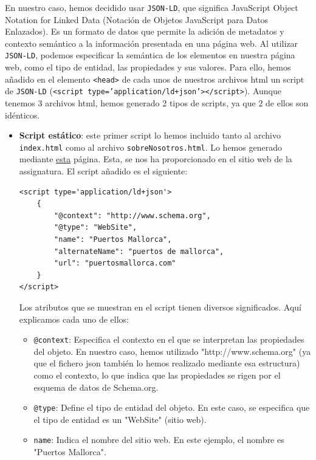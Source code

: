 \documentclass{article}
\begin{document}
\noindent En nuestro caso, hemos decidido usar \texttt{JSON-LD}, que significa JavaScript Object Notation for Linked Data (Notación de Objetos JavaScript para Datos Enlazados). Es un formato de datos que permite la adición de metadatos y contexto semántico a la información presentada en una página web. Al utilizar \texttt{JSON-LD}, podemos especificar la semántica de los elementos en nuestra página web, como el tipo de entidad, las propiedades y sus valores. Para ello, hemos añadido en el elemento \texttt{<head>} de cada unos de nuestros archivos html un script de \texttt{JSON-LD} (\texttt{<script type='application/ld+json'></script>}). Aunque tenemos 3 archivos html, hemos generado 2 tipos de scripts, ya que 2 de ellos son idénticos.
\begin{itemize}
    \item \textbf{Script estático}: este primer script lo hemos incluido tanto al archivo \texttt{index.html} como al archivo \texttt{sobreNosotros.html}. Lo hemos generado mediante \href{https://hallanalysis.com/json-ld-generator/}{esta} página. Esta, se nos ha proporcionado en el sitio web de la assignatura. El script añadido es el siguiente:
    \begin{verbatim}
<script type='application/ld+json'> 
    {
        "@context": "http://www.schema.org",
        "@type": "WebSite",
        "name": "Puertos Mallorca",
        "alternateName": "puertos de mallorca",
        "url": "puertosmallorca.com"
    }
</script>
    \end{verbatim}
    Los atributos que se muestran en el script tienen diversos significados. Aquí explicamos cada uno de ellos:
    \begin{itemize}
        \item \texttt{@context}: Especifica el contexto en el que se interpretan las propiedades del objeto. En nuestro caso, hemos utilizado  "http://www.schema.org" (ya que el fichero json también lo hemos realizado mediante esa estructura) como el contexto, lo que indica que las propiedades se rigen por el esquema de datos de Schema.org.

        \item \texttt{@type}: Define el tipo de entidad del objeto. En este caso, se especifica que el tipo de entidad es un "WebSite" (sitio web).
        
        \item \texttt{name}: Indica el nombre del sitio web. En este ejemplo, el nombre es "Puertos Mallorca".
        

\end{itemize}
\end{itemize}
\end{document}
